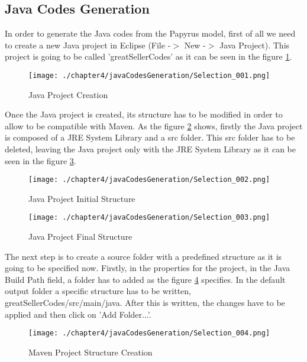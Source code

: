 \subsection{Java Codes Generation}

In order to generate the Java codes from the Papyrus model, first of all we need to create a new Java project in Eclipse (File -$>$ New -$>$ Java Project). This project is going to be called 'greatSellerCodes' as it can be seen in the figure \ref{fig:Java Project Creation}.

\begin{figure}
\centering
{\texttt{[image: ./chapter4/javaCodesGeneration/Selection\_001.png]}}
\caption{Java Project Creation}
\label{fig:Java Project Creation}
\end{figure}

Once the Java project is created, its structure has to be modified in order to allow to be compatible with Maven. As the figure \ref{fig:Java Project Initial Structure} shows, firstly the Java project is composed of a JRE System Library and a src folder. This src folder has to be deleted, leaving the Java project only with the JRE System Library as it can be seen in the figure \ref{fig:Java Project Final Structure}.

\begin{figure}
\centering
{\texttt{[image: ./chapter4/javaCodesGeneration/Selection\_002.png]}}
\caption{Java Project Initial Structure}
\label{fig:Java Project Initial Structure}
\end{figure}

\begin{figure}
\centering
{\texttt{[image: ./chapter4/javaCodesGeneration/Selection\_003.png]}}
\caption{Java Project Final Structure}
\label{fig:Java Project Final Structure}
\end{figure}

The next step is to create a source folder with a predefined structure as it is going to be specified now. Firstly, in the properties for the project, in the Java Build Path field, a folder has to added as the figure \ref{fig:Maven Project Structure Creation} specifies. In the default output folder a specific structure has to be written, greatSellerCodes/src/main/java. After this is written, the changes have to be applied and then click on 'Add Folder...'.

\begin{figure}
\centering
{\texttt{[image: ./chapter4/javaCodesGeneration/Selection\_004.png]}}
\caption{Maven Project Structure Creation}
\label{fig:Maven Project Structure Creation}
\end{figure}

